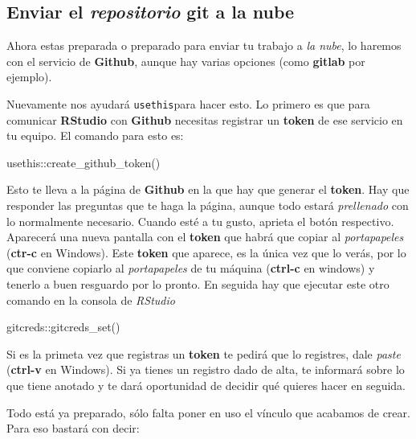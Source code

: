 \documentclass[
  letterpaper,
  DIV=11,
  numbers=noendperiod]{scrartcl}
\newenvironment{Shaded}{\begin{snugshade}}{\end{snugshade}}
\newcommand{\FunctionTok}[1]{\textcolor[rgb]{0.28,0.35,0.67}{#1}}
\newcommand{\NormalTok}[1]{\textcolor[rgb]{0.00,0.23,0.31}{#1}}
\newcommand{\SpecialCharTok}[1]{\textcolor[rgb]{0.37,0.37,0.37}{#1}}
\begin{document}
\subsection{\texorpdfstring{Enviar el \emph{repositorio} \textbf{git} a
la
nube}{Enviar el repositorio git a la nube}}\label{enviar-el-repositorio-git-a-la-nube}

Ahora estas preparada o preparado para enviar tu trabajo a \emph{la
nube}, lo haremos con el servicio de \textbf{Github}, aunque hay varias
opciones (como \textbf{gitlab} por ejemplo).

Nuevamente nos ayudará \texttt{usethis}para hacer esto. Lo primero es
que para comunicar \textbf{RStudio} con \textbf{Github} necesitas
registrar un \textbf{token} de ese servicio en tu equipo. El comando
para esto es:

\begin{Shaded}
\begin{Highlighting}[]
\NormalTok{usethis}\SpecialCharTok{::}\FunctionTok{create\_github\_token}\NormalTok{()}
\end{Highlighting}
\end{Shaded}

Esto te lleva a la página de \textbf{Github} en la que hay que generar
el \textbf{token}. Hay que responder las preguntas que te haga la
página, aunque todo estará \emph{prellenado} con lo normalmente
necesario. Cuando esté a tu gusto, aprieta el botón respectivo.
Aparecerá una nueva pantalla con el \textbf{token} que habrá que copiar
al \emph{portapapeles} (\textbf{ctr-c} en Windows). Este \textbf{token}
que aparece, es la única vez que lo verás, por lo que conviene copiarlo
al \emph{portapapeles} de tu máquina (\textbf{ctrl-c} en windows) y
tenerlo a buen resguardo por lo pronto. En seguida hay que ejecutar este
otro comando en la consola de \emph{RStudio}

\begin{Shaded}
\begin{Highlighting}[]
\NormalTok{gitcreds}\SpecialCharTok{::}\FunctionTok{gitcreds\_set}\NormalTok{()}
\end{Highlighting}
\end{Shaded}

Si es la primeta vez que registras un \textbf{token} te pedirá que lo
registres, dale \emph{paste} (\textbf{ctrl-v} en Windows). Si ya tienes
un registro dado de alta, te informará sobre lo que tiene anotado y te
dará oportunidad de decidir qué quieres hacer en seguida.

Todo está ya preparado, sólo falta poner en uso el vínculo que acabamos
de crear. Para eso bastará con decir:
\end{document}
